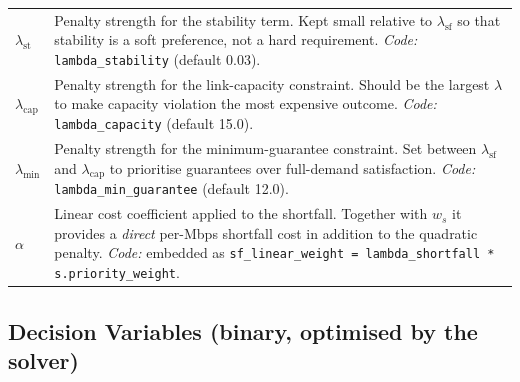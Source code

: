 \documentclass[11pt,a4paper]{article}
\begin{document}
\begin{tabular}{@{}lp{10.5cm}@{}}
$\lambda_{\text{st}}$ & Penalty strength for the stability term.  Kept small
                        relative to $\lambda_{\text{sf}}$ so that stability is a
                        soft preference, not a hard requirement.
                        \textit{Code:} \texttt{lambda\_stability} (default 0.03). \\[4pt]

$\lambda_{\text{cap}}$ & Penalty strength for the link-capacity constraint.
                         Should be the largest $\lambda$ to make capacity
                         violation the most expensive outcome.
                         \textit{Code:} \texttt{lambda\_capacity} (default 15.0). \\[4pt]

$\lambda_{\text{min}}$ & Penalty strength for the minimum-guarantee constraint.
                         Set between $\lambda_{\text{sf}}$ and $\lambda_{\text{cap}}$
                         to prioritise guarantees over full-demand satisfaction.
                         \textit{Code:} \texttt{lambda\_min\_guarantee} (default 12.0). \\[4pt]

$\alpha$ & Linear cost coefficient applied to the shortfall.
           Together with $w_s$ it provides a \emph{direct} per-Mbps shortfall
           cost in addition to the quadratic penalty.
           \textit{Code:} embedded as \texttt{sf\_linear\_weight = lambda\_shortfall * s.priority\_weight}. \\

\bottomrule
\end{tabular}

\subsection*{Decision Variables (binary, optimised by the solver)}
\end{document}
